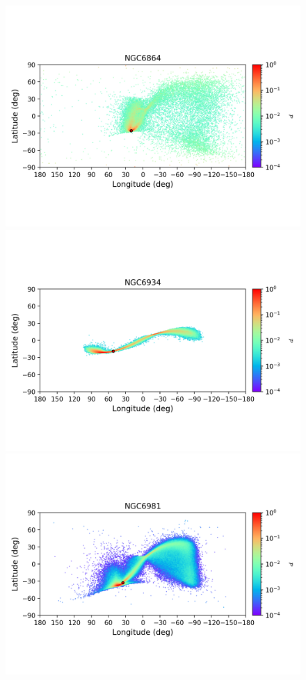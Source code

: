        \begin{figure}
        \includegraphics[clip=true, trim = 0mm 20mm 0mm 10mm, width=1\columnwidth]{images/error_plots_NGC6864.png}
        \includegraphics[clip=true, trim = 0mm 20mm 0mm 10mm, width=1\columnwidth]{images/error_plots_NGC6934.png}
        \includegraphics[clip=true, trim = 0mm 20mm 0mm 10mm, width=1\columnwidth]{images/error_plots_NGC6981.png}

\end{figure}
